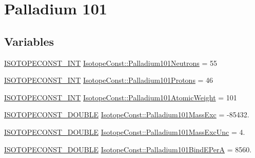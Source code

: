 \hypertarget{group___isotope_const-_palladium-_pd101}{}\section{Palladium 101}
\label{group___isotope_const-_palladium-_pd101}
\subsection*{Variables}
\begin{DoxyCompactItemize}
\item 
\mbox{\hyperlink{group___isotope_const-_macros_ga5f18360b3e99483a35c32d789e62621c}{I\+S\+O\+T\+O\+P\+E\+C\+O\+N\+S\+T\+\_\+\+I\+NT}} \mbox{\hyperlink{group___isotope_const-_palladium-_pd101_gaa26c8b95bdb2304a75473ee44ab61cf3}{Isotope\+Const\+::\+Palladium101\+Neutrons}} = 55
\item 
\mbox{\hyperlink{group___isotope_const-_macros_ga5f18360b3e99483a35c32d789e62621c}{I\+S\+O\+T\+O\+P\+E\+C\+O\+N\+S\+T\+\_\+\+I\+NT}} \mbox{\hyperlink{group___isotope_const-_palladium-_pd101_ga424fb5b5213aac6427fafd41e56fe345}{Isotope\+Const\+::\+Palladium101\+Protons}} = 46
\item 
\mbox{\hyperlink{group___isotope_const-_macros_ga5f18360b3e99483a35c32d789e62621c}{I\+S\+O\+T\+O\+P\+E\+C\+O\+N\+S\+T\+\_\+\+I\+NT}} \mbox{\hyperlink{group___isotope_const-_palladium-_pd101_ga1acfdcf53fc7e5b5ab0cb45c43f811ac}{Isotope\+Const\+::\+Palladium101\+Atomic\+Weight}} = 101
\item 
\mbox{\hyperlink{group___isotope_const-_macros_ga8f45a7272ce02c0b4c65c44636ed719a}{I\+S\+O\+T\+O\+P\+E\+C\+O\+N\+S\+T\+\_\+\+D\+O\+U\+B\+LE}} \mbox{\hyperlink{group___isotope_const-_palladium-_pd101_ga08d7e316cc28b205bf5ae3582be6207d}{Isotope\+Const\+::\+Palladium101\+Mass\+Exc}} = -\/85432.
\item 
\mbox{\hyperlink{group___isotope_const-_macros_ga8f45a7272ce02c0b4c65c44636ed719a}{I\+S\+O\+T\+O\+P\+E\+C\+O\+N\+S\+T\+\_\+\+D\+O\+U\+B\+LE}} \mbox{\hyperlink{group___isotope_const-_palladium-_pd101_ga1604b92606f6e2862cc87dabf8417b80}{Isotope\+Const\+::\+Palladium101\+Mass\+Exc\+Unc}} = 4.
\item 
\mbox{\hyperlink{group___isotope_const-_macros_ga8f45a7272ce02c0b4c65c44636ed719a}{I\+S\+O\+T\+O\+P\+E\+C\+O\+N\+S\+T\+\_\+\+D\+O\+U\+B\+LE}} \mbox{\hyperlink{group___isotope_const-_palladium-_pd101_ga613506420c6286a231478fd3e1748b38}{Isotope\+Const\+::\+Palladium101\+Bind\+E\+PerA}} = 8560.
\item 

\end{DoxyCompactItemize}
